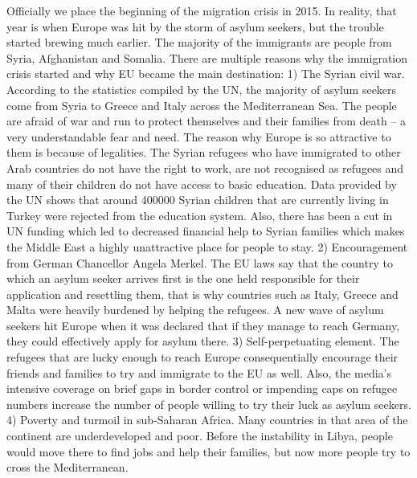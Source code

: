 \documentclass[]{article}
\begin{document}
Officially we place the beginning of the migration crisis in 2015. In
reality, that year is when Europe was hit by the storm of asylum
seekers, but the trouble started brewing much earlier. The majority of
the immigrants are people from Syria, Afghanistan and Somalia. There are
multiple reasons why the immigration crisis started and why EU became
the main destination: 1) The Syrian civil war. According to the
statistics compiled by the UN, the majority of asylum seekers come from
Syria to Greece and Italy across the Mediterranean Sea. The people are
afraid of war and run to protect themselves and their families from
death -- a very understandable fear and need. The reason why Europe is
so attractive to them is because of legalities. The Syrian refugees who
have immigrated to other Arab countries do not have the right to work,
are not recognised as refugees and many of their children do not have
access to basic education. Data provided by the UN shows that around
400000 Syrian children that are currently living in Turkey were rejected
from the education system. Also, there has been a cut in UN funding
which led to decreased financial help to Syrian families which makes the
Middle East a highly unattractive place for people to stay. 2)
Encouragement from German Chancellor Angela Merkel. The EU laws say that
the country to which an asylum seeker arrives first is the one held
responsible for their application and resettling them, that is why
countries such as Italy, Greece and Malta were heavily burdened by
helping the refugees. A new wave of asylum seekers hit Europe when it
was declared that if they manage to reach Germany, they could
effectively apply for asylum there. 3) Self-perpetuating element. The
refugees that are lucky enough to reach Europe consequentially encourage
their friends and families to try and immigrate to the EU as well. Also,
the media's intensive coverage on brief gaps in border control or
impending caps on refugee numbers increase the number of people willing
to try their luck as asylum seekers. 4) Poverty and turmoil in
sub-Saharan Africa. Many countries in that area of the continent are
underdeveloped and poor. Before the instability in Libya, people would
move there to find jobs and help their families, but now more people try
to cross the Mediterranean.
\end{document}
